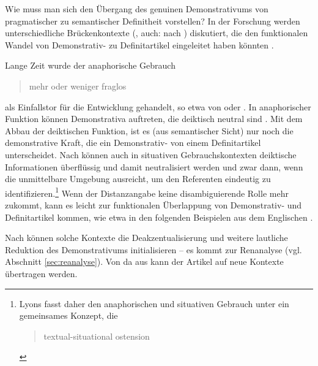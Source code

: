 Wie muss man sich den Übergang des genuinen Demonstrativums von pragmatischer zu semantischer Definitheit vorstellen? In der Forschung werden unterschiedliche Brückenkontexte (\textcite{Heine2002}, auch:  nach \cite{Diewald2002}) diskutiert, die den funktionalen Wandel von Demonstrativ- zu Definitartikel eingeleitet haben könnten \parencite[zur Übersicht s. auch][526-528]{deMulder2011}.

Lange Zeit wurde der anaphorische Gebrauch  \blockcquote[93]{Himmelmann1997}{mehr oder weniger fraglos} als Einfallstor für die Entwicklung gehandelt, so etwa von  \textcite{Oubouzar1989,Oubouzar1992} oder \textcite{Diessel1999}. In anaphorischer Funktion können Demonstrativa auftreten, die deiktisch neutral sind \parencite[41]{Lehmann2015}. Mit dem Abbau der deiktischen Funktion, ist es (aus semantischer Sicht) nur noch die demonstrative Kraft, die ein Demonstrativ- von einem Definitartikel unterscheidet. Nach \textcite[331ff.]{Lyons1999} können auch in situativen Gebrauchskontexten deiktische Informationen überflüssig und damit neutralisiert werden und zwar dann, wenn die unmittelbare Umgebung ausreicht, um den Referenten eindeutig zu identifizieren.\footnote{Lyons fasst daher den anaphorischen und situativen Gebrauch unter ein gemeinsames Konzept, die  \blockcquote[161]{Lyons1999}{textual-situational ostension}.} Wenn der Distanzangabe keine disambiguierende Rolle mehr zukommt, kann es leicht zur funktionalen Überlappung von Demonstrativ- und Definitartikel kommen, wie etwa in den folgenden Beispielen aus dem Englischen \parencite[164]{Lyons1999}. 


 \begin{exe}
	\ex 
	\begin{xlist} \label{ex:lyons}
		\ex \label{ex:lyons-sit}    
		\ex \label{ex:lyons-ana}   
		\end{xlist}
\end{exe}

\noindent
Nach \textcite[332]{Lyons1999} können solche Kontexte die Deakzentualisierung und weitere lautliche Reduktion des Demonstrativums  initialisieren -- es kommt zur Renanalyse (vgl. Abschnitt \ref{sec:reanalyse}). Von da aus kann der Artikel auf neue Kontexte übertragen werden. 

